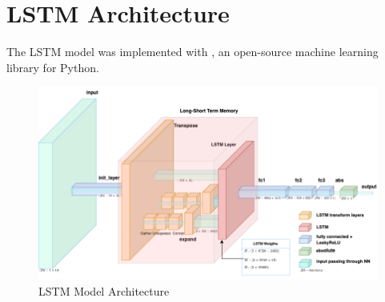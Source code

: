   
\section{LSTM Architecture}
\label{sec:lstm-architecture-and-implementation}

  The LSTM model was implemented with , an open-source machine learning library for Python. 
  \begin{figure}
    \centering
    \includegraphics[scale=0.5]{figures/current_lstm_model.png}
    \caption{LSTM Model Architecture}
    \label{fig:lstm-model-architecture}
  \end{figure}


